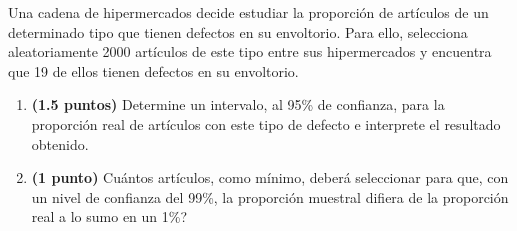
Una cadena de hipermercados decide estudiar la proporción de artículos de un determinado tipo que tienen defectos en su envoltorio. Para ello, selecciona aleatoriamente 2000 artículos de este tipo entre sus hipermercados y encuentra que 19 de ellos tienen defectos en su envoltorio.
\begin{enumerate}[label=\alph*)]
\item \textbf{(1.5 puntos)} Determine un intervalo, al 95\% de confianza, para la proporción real de artículos con este tipo de defecto e interprete el resultado obtenido.
\item \textbf{(1 punto)} \textquestiondown{}Cuántos artículos, como mínimo, deberá seleccionar para que, con un nivel de confianza del 99\%, la proporción muestral difiera de la proporción real a lo sumo en un 1\%?
\end{enumerate}
